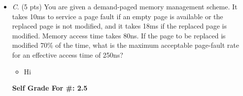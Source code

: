 \documentclass[conference]{IEEEtran}
\begin{document}

\begin{itemize}
	\item \textit{C}. (5 pts) You are given a demand-paged memory management scheme. It takes 10ms to service
	a page fault if an empty page is available or the replaced page is not modified, and it takes 18ms
	if the replaced page is modified. Memory access time takes 80ns. If the page to be replaced is
	modified 70\% of the time, what is the maximum acceptable page-fault rate for an effective
	access time of 250ns?
	\begin{itemize} 
		\item Hi
	\end{itemize}
	
	\begin{center}
		\textbf{Self Grade For \#: 2.5}
	\end{center}
\end{itemize}
\end{document}
